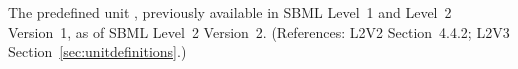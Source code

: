 The predefined unit , previously available in SBML Level~1 and
Level~2 Version~1,  as of SBML Level~2 Version~2.  (References: L2V2 Section~4.4.2;
L2V3 Section~\ref{sec:unitdefinitions}.)
